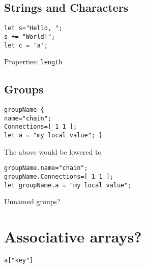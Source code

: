 \documentclass[twocolumn]{article}
\begin{document}
\subsection{Strings and Characters} 
\begin{verbatim}
let s="Hello, ";
s += "World!";
let c = 'a';
\end{verbatim}
Properties: \verb!length!

\subsection{Groups} 
\begin{verbatim}
groupName {
name="chain";
Connections=[ 1 1 ];
let a = "my local value"; }
\end{verbatim}
The above would be lowered to
\begin{verbatim}
groupName.name="chain";
groupName.Connections=[ 1 1 ];
let groupName.a = "my local value";
\end{verbatim}
Unnamed groups?

\section{Associative arrays?}
\verb!a["key"]!
\end{document}
